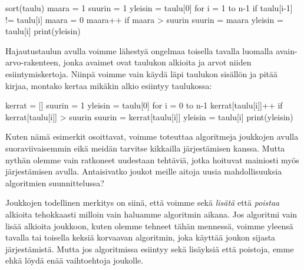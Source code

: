 \begin{code}
sort(taulu)
maara = 1
suurin = 1
yleisin = taulu[0]
for i = 1 to n-1
    if taulu[i-1] != taulu[i]
        maara = 0
    maara++
    if maara > suurin
        suurin = maara
        yleisin = taulu[i]
print(yleisin)
\end{code}

Hajautustaulun avulla voimme lähestyä ongelmaa
toisella tavalla luomalla avain-arvo-rakenteen,
jonka avaimet ovat taulukon alkioita ja arvot niiden
esiintymiskertoja.
Niinpä voimme vain käydä läpi taulukon sisällön ja
pitää kirjaa, montako kertaa mikäkin alkio esiintyy taulukossa:

\begin{code}
kerrat = []
suurin = 1
yleisin = taulu[0]
for i = 0 to n-1
    kerrat[taulu[i]]++
    if kerrat[taulu[i]] > suurin
        suurin = kerrat[taulu[i]]
        yleisin = taulu[i]
print(yleisin)
\end{code}

Kuten nämä esimerkit osoittavat, voimme toteuttaa algoritmeja
joukkojen avulla suoraviivaisemmin eikä meidän tarvitse kikkailla
järjestämisen kanssa.
Mutta nythän olemme vain ratkoneet uudestaan tehtäviä,
jotka hoituvat mainiosti myös järjestämisen avulla.
Antaisivatko joukot meille aitoja uusia mahdollisuuksia
algoritmien suunnittelussa?

Joukkojen todellinen merkitys on siinä, että voimme sekä
\emph{lisätä} että \emph{poistaa} alkioita tehokkaasti milloin vain haluamme
algoritmin aikana.
Jos algoritmi vain lisää alkioita joukkoon,
kuten olemme tehneet tähän mennessä,
voimme yleensä tavalla tai toisella keksiä korvaavan algoritmin,
joka käyttää joukon sijasta järjestämistä.
Mutta jos algoritmissa esiintyy sekä lisäyksiä että poistoja,
emme ehkä löydä enää vaihtoehtoja joukolle.